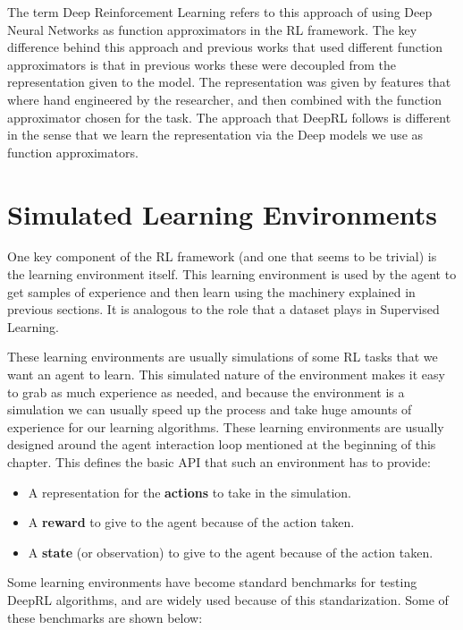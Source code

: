\figRlPolicyParametrization

The term Deep Reinforcement Learning refers to this approach of using Deep Neural Networks
as function approximators in the RL framework. The key difference behind this approach
and previous works that used different function approximators is that in previous works
these were decoupled from the representation given to the model. The representation was 
given by features that where hand engineered by the researcher, and then combined with the 
function approximator chosen for the task. The approach that DeepRL follows is different in 
the sense that we learn the representation via the Deep models we use as function approximators.

\section{Simulated Learning Environments}

One key component of the RL framework (and one that seems to be trivial) is the learning
environment itself. This learning environment is used by the agent to get samples of
experience and then learn using the machinery explained in previous sections. It is analogous
to the role that a dataset plays in Supervised Learning.

These learning environments are usually simulations of some RL tasks that we want an
agent to learn. This simulated nature of the environment makes it easy to grab as much 
experience as needed, and because the environment is a simulation we can usually
speed up the process and take huge amounts of experience for our learning algorithms.
These learning environments are usually designed around the agent interaction loop mentioned
at the beginning of this chapter. This defines the basic API that such an environment
has to provide:

\begin{itemize}
    \item A representation for the \textbf{actions} to take in the simulation.
    \item A \textbf{reward} to give to the agent because of the action taken.
    \item A \textbf{state} (or observation) to give to the agent because of the action taken.
\end{itemize}

\newpage

Some learning environments have become standard benchmarks for testing DeepRL algorithms, 
and are widely used because of this standarization. Some of these benchmarks are shown below:

